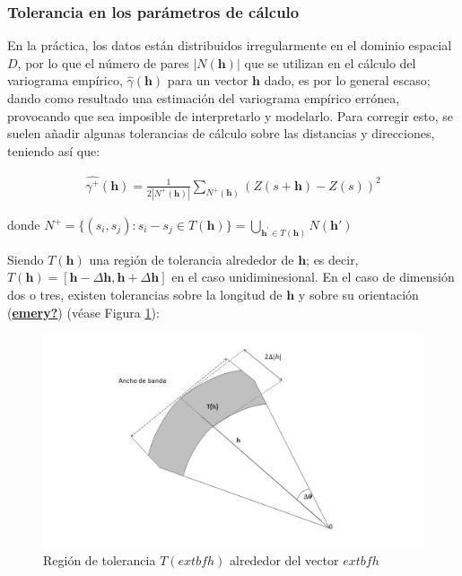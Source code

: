 \documentclass[
]{book}
\begin{document}
\hypertarget{tolerancia-en-los-paruxe1metros-de-cuxe1lculo}{%
\subsubsection*{Tolerancia en los parámetros de cálculo}\label{tolerancia-en-los-paruxe1metros-de-cuxe1lculo}}

En la práctica, los datos están distribuidos irregularmente en el dominio espacial \(D\), por lo que el número de pares \(|N(\textbf{h})|\) que se utilizan en el cálculo del variograma empírico, \(\hat{\gamma}(\textbf{h})\) para un vector \(\textbf{h}\) dado, es por lo general escaso; dando como resultado una estimación del variograma empírico errónea, provocando que sea imposible de interpretarlo y modelarlo. Para corregir esto, se suelen añadir algunas tolerancias de cálculo sobre las distancias y direcciones, teniendo así que:

\begin{align}
  \hat{\gamma^+}(\textbf{h})=\frac{1}{2|N^+(\textbf{h})|}\sum_{N^+(\textbf{h})}(Z(s+\textbf{h})-Z(s))^2  
\end{align}

donde \(N^+=\{(s_i,s_j): s_i-s_j\in T(\textbf{h})\}=\displaystyle \bigcup_{\textbf{h}^{'}\in T(\textbf{h})}N(\textbf{h}')\)

Siendo \(T(\textbf{h})\) una región de tolerancia alrededor de \(\textbf{h}\); es decir, \(T(\textbf{h})=[\textbf{h}-\Delta \textbf{h},\textbf{h}+\Delta \textbf{h}]\) en el caso unidiminesional. En el caso de dimensión dos o tres, existen tolerancias sobre la longitud de \(\textbf{h}\) y sobre su orientación (\protect\hyperlink{ref-emery}{\textbf{emery?}}) (véase Figura \ref{fig:regtol}):

\begin{figure}
\includegraphics[width=17.78in]{figuras/otros/tolerancia} \caption{Región de tolerancia $T( extbf{h})$ alrededor del vector $   extbf{h}$}\label{fig:regtol}
\end{figure}
\end{document}
